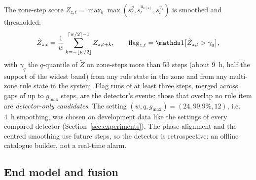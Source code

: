 The zone-step score $Z_{z,t} = \max_b \max(s^{g}_t, s^{u_{c(z)}}_t, s^{v_z}_t)$ is smoothed and thresholded:
\begin{equation}
\tilde{Z}_{z,t} = \frac{1}{w} \sum_{k=-\lfloor w/2 \rfloor}^{\lceil w/2 \rceil - 1} Z_{z,t+k}, \qquad
\mathrm{flag}_{z,t} = \one\big[\tilde{Z}_{z,t} > \gamma_q\big],
\label{eq:events}
\end{equation}
with $\gamma_q$ the $q$-quantile of $\tilde{Z}$ on zone-steps more than 53 steps (about 9~h, half the support of the widest band) from any rule state in the zone and from any multi-zone rule state in the system. Flag runs of at least three steps, merged across gaps of up to $g_{\max}$ steps, are the detector's events; those that overlap no rule item are \emph{detector-only candidates}. The setting $(w, q, g_{\max}) = (24, 99.9\%, 12)$, i.e. 4~h smoothing, was chosen on development data like the settings of every compared detector (Section~\ref{sec:experiments}). The phase alignment and the centred smoothing use future steps, so the detector is retrospective: an offline catalogue builder, not a real-time alarm.

\subsection{End model and fusion}\label{sec:fusion}

